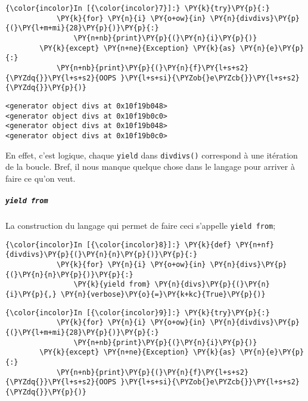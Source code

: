     \begin{Verbatim}[commandchars=\\\{\},frame=single,framerule=0.3mm,rulecolor=\color{cellframecolor}]
{\color{incolor}In [{\color{incolor}7}]:} \PY{k}{try}\PY{p}{:}
            \PY{k}{for} \PY{n}{i} \PY{o+ow}{in} \PY{n}{divdivs}\PY{p}{(}\PY{l+m+mi}{28}\PY{p}{)}\PY{p}{:}
                \PY{n+nb}{print}\PY{p}{(}\PY{n}{i}\PY{p}{)}
        \PY{k}{except} \PY{n+ne}{Exception} \PY{k}{as} \PY{n}{e}\PY{p}{:}
            \PY{n+nb}{print}\PY{p}{(}\PY{n}{f}\PY{l+s+s2}{\PYZdq{}}\PY{l+s+s2}{OOPS }\PY{l+s+si}{\PYZob{}e\PYZcb{}}\PY{l+s+s2}{\PYZdq{}}\PY{p}{)}
\end{Verbatim}


    \begin{Verbatim}[commandchars=\\\{\},frame=single,framerule=0.3mm,rulecolor=\color{cellframecolor}]
<generator object divs at 0x10f19b048>
<generator object divs at 0x10f19b0c0>
<generator object divs at 0x10f19b048>
<generator object divs at 0x10f19b0c0>
\end{Verbatim}

    En effet, c'est logique, chaque \texttt{yield} dans \texttt{divdivs()}
correspond à une itération de la boucle. Bref, il nous manque quelque
chose dans le langage pour arriver à faire ce qu'on veut.

    \hypertarget{yield-from}{%
\subparagraph{\texorpdfstring{\texttt{yield\ from}}{yield from}}\label{yield-from}}

    La construction du langage qui permet de faire ceci s'appelle
\texttt{yield\ from};

    \begin{Verbatim}[commandchars=\\\{\},frame=single,framerule=0.3mm,rulecolor=\color{cellframecolor}]
{\color{incolor}In [{\color{incolor}8}]:} \PY{k}{def} \PY{n+nf}{divdivs}\PY{p}{(}\PY{n}{n}\PY{p}{)}\PY{p}{:}
            \PY{k}{for} \PY{n}{i} \PY{o+ow}{in} \PY{n}{divs}\PY{p}{(}\PY{n}{n}\PY{p}{)}\PY{p}{:}
                \PY{k}{yield from} \PY{n}{divs}\PY{p}{(}\PY{n}{i}\PY{p}{,} \PY{n}{verbose}\PY{o}{=}\PY{k+kc}{True}\PY{p}{)}
\end{Verbatim}


    \begin{Verbatim}[commandchars=\\\{\},frame=single,framerule=0.3mm,rulecolor=\color{cellframecolor}]
{\color{incolor}In [{\color{incolor}9}]:} \PY{k}{try}\PY{p}{:}
            \PY{k}{for} \PY{n}{i} \PY{o+ow}{in} \PY{n}{divdivs}\PY{p}{(}\PY{l+m+mi}{28}\PY{p}{)}\PY{p}{:}
                \PY{n+nb}{print}\PY{p}{(}\PY{n}{i}\PY{p}{)}
        \PY{k}{except} \PY{n+ne}{Exception} \PY{k}{as} \PY{n}{e}\PY{p}{:}
            \PY{n+nb}{print}\PY{p}{(}\PY{n}{f}\PY{l+s+s2}{\PYZdq{}}\PY{l+s+s2}{OOPS }\PY{l+s+si}{\PYZob{}e\PYZcb{}}\PY{l+s+s2}{\PYZdq{}}\PY{p}{)}
\end{Verbatim}


